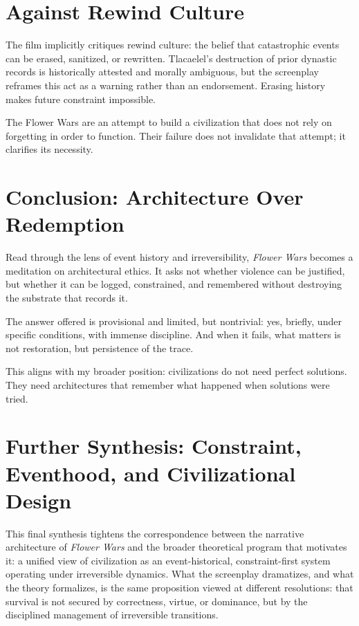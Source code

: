 \documentclass[12pt]{article}
\begin{document}
\section*{Against Rewind Culture}

The film implicitly critiques rewind culture: the belief that catastrophic events can be erased, sanitized, or rewritten. Tlacaelel's destruction of prior dynastic records is historically attested and morally ambiguous, but the screenplay reframes this act as a warning rather than an endorsement. Erasing history makes future constraint impossible.

The Flower Wars are an attempt to build a civilization that does not rely on forgetting in order to function. Their failure does not invalidate that attempt; it clarifies its necessity.

\section*{Conclusion: Architecture Over Redemption}

Read through the lens of event history and irreversibility, \textit{Flower Wars} becomes a meditation on architectural ethics. It asks not whether violence can be justified, but whether it can be logged, constrained, and remembered without destroying the substrate that records it.

The answer offered is provisional and limited, but nontrivial: yes, briefly, under specific conditions, with immense discipline. And when it fails, what matters is not restoration, but persistence of the trace.

This aligns with my broader position: civilizations do not need perfect solutions. They need architectures that remember what happened when solutions were tried. 

\section*{Further Synthesis: Constraint, Eventhood, and Civilizational Design}

This final synthesis tightens the correspondence between the narrative architecture of \textit{Flower Wars} and the broader theoretical program that motivates it: a unified view of civilization as an event-historical, constraint-first system operating under irreversible dynamics. What the screenplay dramatizes, and what the theory formalizes, is the same proposition viewed at different resolutions: that survival is not secured by correctness, virtue, or dominance, but by the disciplined management of irreversible transitions.
\end{document}

